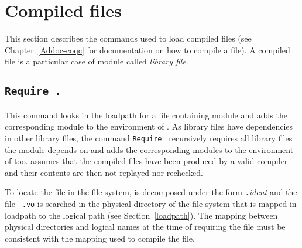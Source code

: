 \begin{ErrMsgs}
\item {}
\end{ErrMsgs}

\section[Compiled files]{Compiled files\label{compiled}}

This section describes the commands used to load compiled files (see
Chapter~\ref{Addoc-coqc} for documentation on how to compile a file).
A compiled file is a particular case of module called {\em library file}.


\subsection[\tt Require {\qualid}.]{\tt Require {\qualid}.\label{Require}
}

This command looks in the loadpath for a file containing
module {\qualid} and adds the corresponding module to the environment
of {\Coq}. As library files have dependencies in other library files,
the command {\tt Require {\qualid}} recursively requires all library
files the module {\qualid} depends on and adds the corresponding modules to the
environment of {\Coq} too. {\Coq} assumes that the compiled files have
been produced by a valid {\Coq} compiler and their contents are then not
replayed nor rechecked.

To locate the file in the file system, {\qualid} is decomposed under
the form {\dirpath}{\tt .}{\textsl{ident}} and the file {\ident}{\tt
.vo} is searched in the physical directory of the file system that is
mapped in {\Coq} loadpath to the logical path {\dirpath} (see
Section~\ref{loadpath}). The mapping between physical directories and
logical names at the time of requiring the file must be consistent
with the mapping used to compile the file.

